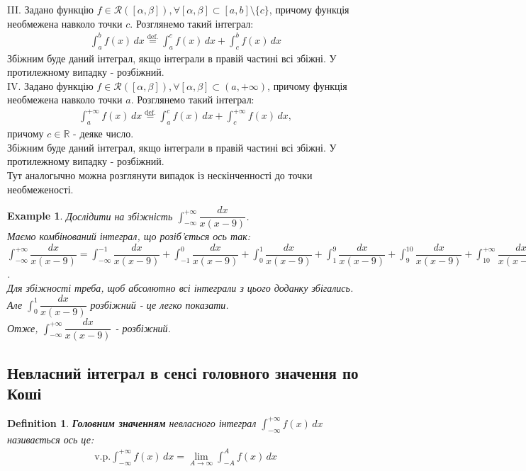 \documentclass[a4paper, 10pt]{article}
\theoremstyle{theoremdd}
\theoremstyle{theoremdd}
\theoremstyle{theoremdd}
\newtheorem{definition}[theorem]{Definition}
\theoremstyle{theoremdd}
\theoremstyle{theoremdd}
\newtheorem{example}[theorem]{Example}
\theoremstyle{theoremdd}
\theoremstyle{theoremdd}
\theoremstyle{theoremdd}
\theoremstyle{theoremdd}
\begin{document}
III. Задано функцію $f \in \mathcal{R}([\alpha,\beta]), \forall [\alpha,\beta] \subset [a,b] \setminus \{c\}$, причому функція необмежена навколо точки $c$. Розглянемо такий інтеграл:
\begin{align*}
\int_a^b f(x)\,dx \overset{\text{def.}}{=} \int_a^c f(x)\,dx + \int_c^b f(x)\,dx
\end{align*}
Збіжним буде даний інтеграл, якщо інтеграли в правій частині всі збіжні. У протилежному випадку - розбіжний.
\bigskip \\
IV. Задано функцію $f \in \mathcal{R}([\alpha,\beta]), \forall [\alpha,\beta] \subset (a,+\infty)$, причому функція необмежена навколо точки $a$. Розглянемо такий інтеграл:
\begin{align*}
\int_a^{+\infty} f(x)\,dx \overset{\text{def.}}{=} \int_a^c f(x)\,dx + \int_c^{+\infty} f(x)\,dx,
\end{align*}
причому $c \in \mathbb{R}$ - деяке число.\\
Збіжним буде даний інтеграл, якщо інтеграли в правій частині всі збіжні. У протилежному випадку - розбіжний.\\
Тут аналогычно можна розглянути випадок із нескінченності до точки необмеженості.

\begin{example}
Дослідити на збіжність $\displaystyle\int_{-\infty}^{+\infty} \dfrac{dx}{x(x-9)}$.\\
Маємо комбінований інтеграл, що розіб'ється ось так:\\
$\displaystyle\int_{-\infty}^{+\infty} \dfrac{dx}{x(x-9)} = \int_{-\infty}^{-1} \dfrac{dx}{x(x-9)} + \int_{-1}^{0} \dfrac{dx}{x(x-9)} + \int_{0}^{1} \dfrac{dx}{x(x-9)} + \int_{1}^{9} \dfrac{dx}{x(x-9)} + \int_{9}^{10} \dfrac{dx}{x(x-9)} + \int_{10}^{+\infty} \dfrac{dx}{x(x-9)}$.\\
Для збіжності треба, щоб абсолютно всі інтеграли з цього доданку збігались. Але $\displaystyle\int_0^1 \dfrac{dx}{x(x-9)}$ розбіжний - це легко показати.\\
Отже, $\displaystyle\int_{-\infty}^{+\infty} \dfrac{dx}{x(x-9)}$ - розбіжний.
\end{example}

\subsection{Невласний інтеграл в сенсі головного значення по Коші}
\begin{definition}
\textbf{Головним значенням} невласного інтеграл $\displaystyle\int_{-\infty}^{+\infty} f(x)\,dx$ називається ось це:
\begin{align*}
\text{v.p.} \int_{-\infty}^{+\infty} f(x)\,dx = \lim_{A \to \infty} \int_{-A}^A f(x)\,dx
\end{align*}
\end{definition}
\end{document}
